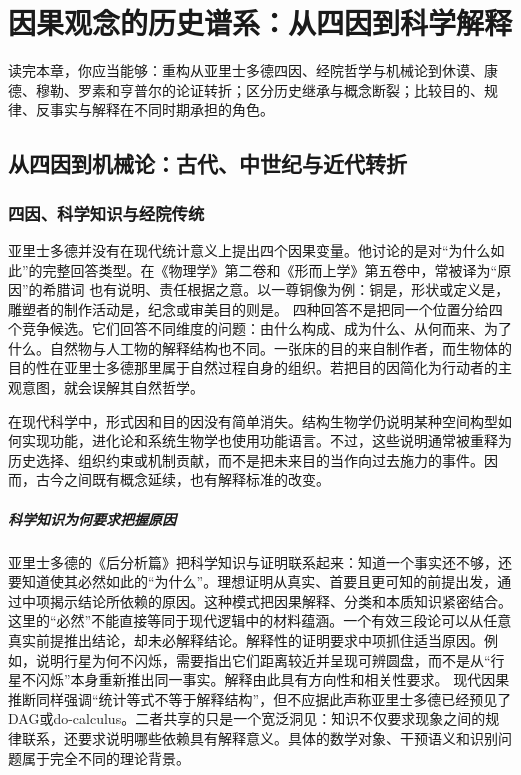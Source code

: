 \chapter{因果观念的历史谱系：从四因到科学解释}
\label{ch:history}

\begin{learninggoals}
读完本章，你应当能够：重构从亚里士多德四因、经院哲学与机械论到休谟、康德、穆勒、罗素和亨普尔的论证转折；区分历史继承与概念断裂；比较目的、规律、反事实与解释在不同时期承担的角色。
\end{learninggoals}

\section{从四因到机械论：古代、中世纪与近代转折}

\subsection{四因、科学知识与经院传统}

亚里士多德并没有在现代统计意义上提出四个因果变量。他讨论的是对“为什么如此”的完整回答类型。在《物理学》第二卷和《形而上学》第五卷中，常被译为“原因”的希腊词  也有说明、责任根据之意\parencite{aristotlePhysics,aristotleMetaphysics}。以一尊铜像为例：铜是，形状或定义是，雕塑者的制作活动是，纪念或审美目的则是。
四种回答不是把同一个位置分给四个竞争候选。它们回答不同维度的问题：由什么构成、成为什么、从何而来、为了什么。自然物与人工物的解释结构也不同。一张床的目的来自制作者，而生物体的目的性在亚里士多德那里属于自然过程自身的组织。若把目的因简化为行动者的主观意图，就会误解其自然哲学。

在现代科学中，形式因和目的因没有简单消失。结构生物学仍说明某种空间构型如何实现功能，进化论和系统生物学也使用功能语言。不过，这些说明通常被重释为历史选择、组织约束或机制贡献，而不是把未来目的当作向过去施力的事件。因而，古今之间既有概念延续，也有解释标准的改变。

\paragraph{科学知识为何要求把握原因}

亚里士多德的《后分析篇》把科学知识与证明联系起来：知道一个事实还不够，还要知道使其必然如此的“为什么”\parencite{aristotlePosterior}。理想证明从真实、首要且更可知的前提出发，通过中项揭示结论所依赖的原因。这种模式把因果解释、分类和本质知识紧密结合。
这里的“必然”不能直接等同于现代逻辑中的材料蕴涵。一个有效三段论可以从任意真实前提推出结论，却未必解释结论。解释性的证明要求中项抓住适当原因。例如，说明行星为何不闪烁，需要指出它们距离较近并呈现可辨圆盘，而不是从“行星不闪烁”本身重新推出同一事实。解释由此具有方向性和相关性要求。
现代因果推断同样强调“统计等式不等于解释结构”，但不应据此声称亚里士多德已经预见了DAG或do-calculus。二者共享的只是一个宽泛洞见：知识不仅要求现象之间的规律联系，还要求说明哪些依赖具有解释意义。具体的数学对象、干预语义和识别问题属于完全不同的理论背景。

